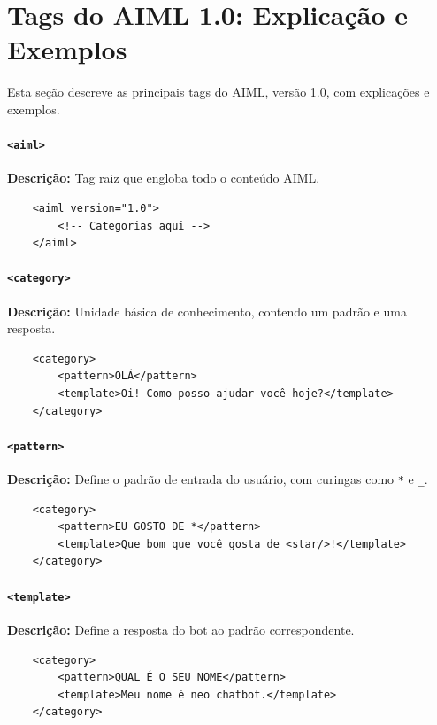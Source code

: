 \documentclass[14pt,a4paper,oneside]{book}
\begin{document}
\section{Tags do AIML 1.0: Explicação e Exemplos}

Esta seção descreve as principais tags do AIML, versão 1.0, com explicações e exemplos.

\paragraph{\texttt{<aiml>}} 

\textbf{Descrição:} Tag raiz que engloba todo o conteúdo AIML. 

\begin{lstlisting}
	<aiml version="1.0">
		<!-- Categorias aqui -->
	</aiml>
\end{lstlisting}

\paragraph{\texttt{<category>}} 

\textbf{Descrição:} Unidade básica de conhecimento, contendo um padrão e uma resposta. 

\begin{lstlisting}
	<category>
		<pattern>OLÁ</pattern>
		<template>Oi! Como posso ajudar você hoje?</template>
	</category>
\end{lstlisting}

\paragraph{\texttt{<pattern>}} 

\textbf{Descrição:} Define o padrão de entrada do usuário, com curingas como \texttt{*} e \texttt{\_}. 

\begin{lstlisting}
	<category>
		<pattern>EU GOSTO DE *</pattern>
		<template>Que bom que você gosta de <star/>!</template>
	</category>
\end{lstlisting}

\paragraph{\texttt{<template>}} 

\textbf{Descrição:} Define a resposta do bot ao padrão correspondente. 

\begin{lstlisting}
	<category>
		<pattern>QUAL É O SEU NOME</pattern>
		<template>Meu nome é neo chatbot.</template>
	</category> 
\end{lstlisting}
\end{document}
